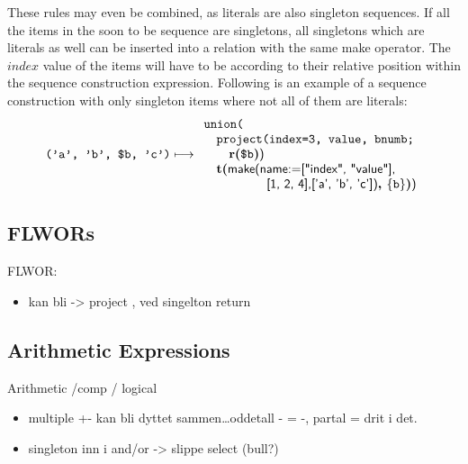 These rules may even be combined, as literals are also singleton sequences. If all the items in the soon to 
be sequence are singletons, all singletons which are literals as well can be inserted into a relation with
the same \textsf{make} operator. The $index$ value of the items will have to be according to their relative 
position within the sequence construction expression. Following is an example of a sequence construction with
only singleton items where not all of them are literals:
\begin{equation*}
\mbox{\texttt{('a', 'b', \$b, 'c')}}\longmapsto
\begin{array}{l}
\mbox{\texttt{union(}} \\ \quad
\mbox{\texttt{project(index=3, value, bnumb;}} \\ \quad \quad
\mbox{\textbf{r(}}\texttt{\$b}\mbox{\textbf{)}\textsf{)}} \\ \quad
\mbox{\textbf{t(}}
\mbox{\textsf{make(name:=["index", "value"],}} \\ \quad \quad \quad \quad \quad 
\mbox{\textsf{[1, 2, 4],['a', 'b', 'c'])}\textbf{,
}}\{\mbox{\texttt{b}}\}\mbox{\textbf{)}\textsf{)}}
\end{array}
\end{equation*}
      

\subsection{FLWORs}
\label{sect:trans:TD:simpl:flwor}        
  FLWOR:
  	\begin{itemize}
        \item  kan bli -> project , ved singelton return
      \end{itemize}

\subsection{Arithmetic Expressions}
\label{sect:trans:TD:simpl:arith}         
  Arithmetic /comp / logical
	\begin{itemize}
      \item multiple +- kan bli dyttet sammen\ldots oddetall - = -, partal = drit i det.
      \item singleton inn i and/or -> slippe select (bull?)
    \end{itemize}
